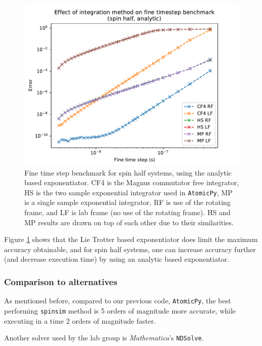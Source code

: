 \documentclass{jors}
\begin{document}
			\begin{figure}[h!]
				\includegraphics[scale=0.9]{benchmark_comparison_spin_half_a_publication.pdf}
				\caption{Fine time step benchmark for spin half systems, using the analytic based exponentiator. CF4 is the Magnus commutator free integrator, HS is the two sample exponential integrator used in \texttt{AtomicPy}, MP is a single sample exponential integrator, RF is use of the rotating frame, and LF is lab frame (no use of the rotating frame). HS and MP results are drawn on top of each other due to their similarities.}
				\label{fig:benchmark_comparison_spin_half_a}
			\end{figure}

			Figure \ref{fig:benchmark_comparison_spin_half_a} shows that the Lie Trotter based exponentiator does limit the maximum accuracy obtainable, and for spin half systems, one can increase accuracy further (and decrease execution time) by using an analytic based exponentiator.

		\subsubsection*{Comparison to alternatives}
			As mentioned before, compared to our previous code, \texttt{AtomicPy}, the best performing \texttt{spinsim} method is 5 orders of magnitude more accurate, while executing in a time 2 orders of magnitude faster.

			Another solver used by the lab group is \emph{Mathematica}'s \texttt{NDSolve}.
\end{document}
